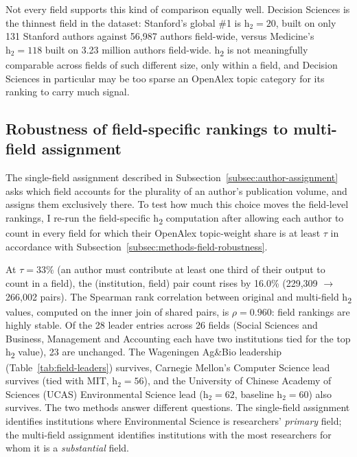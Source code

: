 Not every field supports this kind of comparison equally well. Decision Sciences is the thinnest field in the dataset: Stanford's global \#1 is $\mathrm{h}_2=20$, built on only 131 Stanford authors against 56,987 authors field-wide, versus Medicine's $\mathrm{h}_2=118$ built on 3.23 million authors field-wide. h\textsubscript{2} is not meaningfully comparable across fields of such different size, only within a field, and Decision Sciences in particular may be too sparse an OpenAlex topic category for its ranking to carry much signal.

\subsection{Robustness of field-specific rankings to multi-field assignment}
\label{subsec:results-field-robustness}
The single-field assignment described in Subsection~\ref{subsec:author-assignment} asks which field accounts for the plurality of an author's publication volume, and assigns them exclusively there. To test how much this choice moves the field-level rankings, I re-run the field-specific h\textsubscript{2} computation after allowing each author to count in every field for which their OpenAlex topic-weight share is at least $\tau$ in accordance with Subsection~\ref{subsec:methods-field-robustness}.

At $\tau = 33\%$ (an author must contribute at least one third of their output to count in a field), the (institution, field) pair count rises by 16.0\% (229{,}309 $\to$ 266{,}002 pairs). The Spearman rank correlation between original and multi-field h\textsubscript{2} values, computed on the inner join of shared pairs, is $\rho = 0.960$: field rankings are highly stable. Of the 28 leader entries across 26 fields (Social Sciences and Business, Management and Accounting each have two institutions tied for the top h\textsubscript{2} value), 23 are unchanged. The Wageningen Ag\&Bio leadership (Table~\ref{tab:field-leaders}) survives, Carnegie Mellon's Computer Science lead survives (tied with MIT, $\mathrm{h}_2 = 56$), and the University of Chinese Academy of Sciences (UCAS) Environmental Science lead ($\mathrm{h}_2 = 62$, baseline $\mathrm{h}_2 = 60$) also survives. The two methods answer different questions. The single-field assignment identifies institutions where Environmental Science is researchers' \emph{primary} field; the multi-field assignment identifies institutions with the most researchers for whom it is a \emph{substantial} field.

